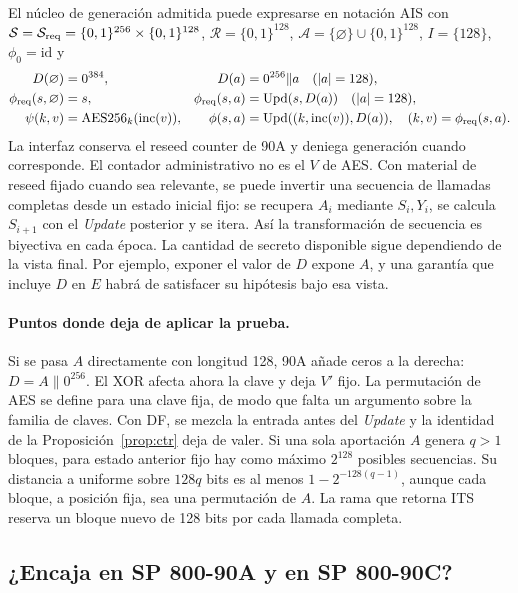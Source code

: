 \documentclass[11pt,a4paper]{article}
\newcommand{\bits}{\{0,1\}}
\newcommand{\AES}{\operatorname{AES256}}
\begin{document}
El núcleo de generación admitida puede expresarse en notación AIS
con \(\mathcal S=\mathcal S_{\rm req}=\bits^{256}\times\bits^{128}\),
\(\mathcal R=\bits^{128}\), \(\mathcal A=\{\varnothing\}\cup\bits^{128}\),
\(I=\{128\}\), \(\phi_0=\mathrm{id}\) y
\begin{align*}
 D(\varnothing)&=0^{384},&
 D(a)&=0^{256}\|a \quad (|a|=128),\\
 \phi_{\rm req}(s,\varnothing)&=s,&
 \phi_{\rm req}(s,a)&=\operatorname{Upd}(s,D(a))\quad (|a|=128),\\
 \psi(k,v)&=\AES_k(\operatorname{inc}(v)),&
 \phi(s,a)&=\operatorname{Upd}((k,\operatorname{inc}(v)),D(a)),
 \quad (k,v)=\phi_{\rm req}(s,a).
\end{align*}
La interfaz conserva el reseed counter de 90A y deniega generación
cuando corresponde. El contador administrativo no es el \(V\) de AES.
Con material de reseed fijado cuando sea relevante, se puede invertir
una secuencia de llamadas completas desde un estado inicial fijo:
se recupera \(A_i\) mediante \(S_i,Y_i\), se calcula
\(S_{i+1}\) con el \emph{Update} posterior y se itera.
Así la transformación de secuencia es biyectiva en cada época.
La cantidad de secreto disponible sigue dependiendo de la vista final.
Por ejemplo, exponer el valor de \(D\) expone \(A\), y una garantía
que incluye \(D\) en \(E\) habrá de satisfacer su hipótesis bajo esa vista.

\paragraph{Puntos donde deja de aplicar la prueba.}
Si se pasa \(A\) directamente con longitud 128, 90A añade
ceros a la derecha: \(D=A\|0^{256}\). El XOR afecta ahora
la clave y deja \(V'\) fijo. La permutación de AES se define para
una clave fija, de modo que falta un argumento sobre la familia de
claves. Con DF, se mezcla la entrada antes del \emph{Update} y la
identidad de la Proposición~\ref{prop:ctr} deja de valer.
Si una sola aportación \(A\) genera \(q>1\) bloques, para estado
anterior fijo hay como máximo \(2^{128}\) posibles secuencias.
Su distancia a uniforme sobre \(128q\) bits es al menos
\(1-2^{-128(q-1)}\), aunque cada bloque, a posición fija, sea
una permutación de \(A\). La rama que retorna ITS reserva un
bloque nuevo de 128 bits por cada llamada completa.

\subsection{¿Encaja en SP 800-90A y en SP 800-90C?}
\end{document}
